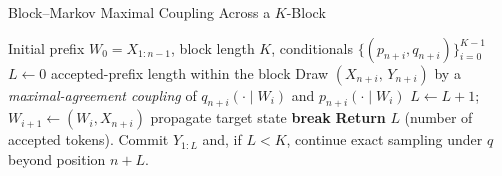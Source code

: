 \begin{algorithm}[t]
\caption{Block–Markov Maximal Coupling Across a $K$-Block}
\label{alg:block-markov-max-coupling}
\begin{algorithmic}[1]
\Require Initial prefix $W_0=X_{1:n-1}$, block length $K$, conditionals $\{(p_{n+i},q_{n+i})\}_{i=0}^{K-1}$
\State $L\gets 0$ \Comment accepted-prefix length within the block
  \State Draw $(X_{n+i},\,Y_{n+i})$ by a \emph{maximal-agreement coupling} of $q_{n+i}(\cdot\mid W_i)$ and $p_{n+i}(\cdot\mid W_i)$
     \State $L\gets L+1$; \hspace{0.5em} $W_{i+1}\gets (W_i, X_{n+i})$ \Comment propagate target state
  \Else
     \State \textbf{break}
  \EndIf
\EndFor
\State \textbf{Return} $L$ (number of accepted tokens). Commit $Y_{1:L}$ and, if $L<K$, continue exact sampling under $q$ beyond position $n+L$.
\end{algorithmic}
\end{algorithm}
